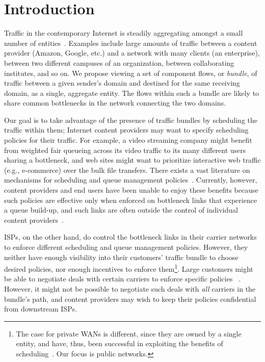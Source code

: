 \section{Introduction}\label{s:intro}

Traffic in the contemporary Internet is steadily aggregating amongst a small number of entities~\cite{fivecomps}. 
Examples include large amounts of traffic between a content provider (\eg Amazon, Google, etc.) and a network with many clients (\eg an enterprise), between two different campuses of an organization, between collaborating institutes, and so on.
We propose viewing a set of component flows, or \emph{bundle}, of traffic between a given sender's domain and destined for the same receiving domain, as a single, aggregate entity.
The flows within such a bundle are likely to share common bottlenecks in the network connecting the two domains.

Our goal is to take advantage of the presence of traffic bundles by scheduling the traffic within them;
Internet content providers may want to specify scheduling policies for their traffic. 
For example, a video streaming company might benefit from weighted fair queueing across its video traffic to its many different users sharing a bottleneck, and web sites might want to prioritize interactive web traffic (e.g., e-commerce) over the bulk file transfers. 
There exists a vast literature on mechanisms for scheduling and queue management policies~\cite{diffserv, fair-queueing, sfq, pie, CoDel, fifoplus, virtualClocks, csfq, drr, red, ecn}.
Currently, however, content providers and end users have been unable to enjoy these benefits because such policies are effective only when enforced on bottleneck links that experience a queue build-up, and such links are often outside the control of individual content 
providers~\cite{inferring-interdomain-congestion, isp-throttle-1, isp-throttle-2, isp-throttle-3}. 

ISPs, on the other hand, do control the bottleneck links in their carrier networks to enforce different scheduling and queue management policies. 
However, they neither have enough visibility into their customers' traffic bundle to choose desired policies, nor enough incentives to enforce them\footnote{The case for private WANs is different, since they are owned by a single entity, and have, thus, been successful in exploiting the benefits of scheduling~\cite{swan, b4, bwe}. Our focus is public networks.}.
Large customers might be able to negotiate deals with certain carriers to enforce specific policies~\cite{att-qos} . 
However, it might not be possible to negotiate such deals with \emph{all} carriers in the bundle's path, and content providers may wish to keep their policies confidential from downstream ISPs.

